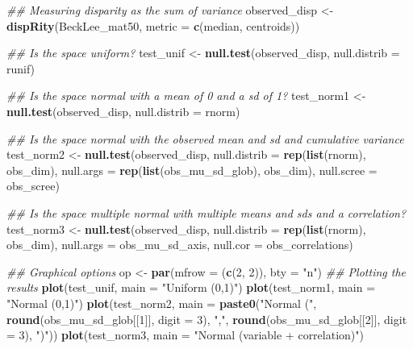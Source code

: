 \documentclass[
]{book}
\newenvironment{Shaded}{\begin{snugshade}}{\end{snugshade}}
\newcommand{\CommentTok}[1]{\textcolor[rgb]{0.56,0.35,0.01}{\textit{#1}}}
\newcommand{\DataTypeTok}[1]{\textcolor[rgb]{0.13,0.29,0.53}{#1}}
\newcommand{\DecValTok}[1]{\textcolor[rgb]{0.00,0.00,0.81}{#1}}
\newcommand{\KeywordTok}[1]{\textcolor[rgb]{0.13,0.29,0.53}{\textbf{#1}}}
\newcommand{\NormalTok}[1]{#1}
\newcommand{\StringTok}[1]{\textcolor[rgb]{0.31,0.60,0.02}{#1}}
\begin{document}
\begin{Shaded}
\begin{Highlighting}[]
\CommentTok{\#\# Measuring disparity as the sum of variance}
\NormalTok{observed\_disp \textless{}{-}}\StringTok{ }\KeywordTok{dispRity}\NormalTok{(BeckLee\_mat50, }\DataTypeTok{metric =} \KeywordTok{c}\NormalTok{(median, centroids))}

\CommentTok{\#\# Is the space uniform?}
\NormalTok{test\_unif \textless{}{-}}\StringTok{ }\KeywordTok{null.test}\NormalTok{(observed\_disp, }\DataTypeTok{null.distrib =}\NormalTok{ runif)}

\CommentTok{\#\# Is the space normal with a mean of 0 and a sd of 1?}
\NormalTok{test\_norm1 \textless{}{-}}\StringTok{ }\KeywordTok{null.test}\NormalTok{(observed\_disp, }\DataTypeTok{null.distrib =}\NormalTok{ rnorm)}

\CommentTok{\#\# Is the space normal with the observed mean and sd and cumulative variance}
\NormalTok{test\_norm2 \textless{}{-}}\StringTok{ }\KeywordTok{null.test}\NormalTok{(observed\_disp, }\DataTypeTok{null.distrib =} \KeywordTok{rep}\NormalTok{(}\KeywordTok{list}\NormalTok{(rnorm), obs\_dim),}
                        \DataTypeTok{null.args =} \KeywordTok{rep}\NormalTok{(}\KeywordTok{list}\NormalTok{(obs\_mu\_sd\_glob), obs\_dim),}
                        \DataTypeTok{null.scree =}\NormalTok{ obs\_scree)}

\CommentTok{\#\# Is the space multiple normal with multiple means and sds and a correlation?}
\NormalTok{test\_norm3 \textless{}{-}}\StringTok{ }\KeywordTok{null.test}\NormalTok{(observed\_disp, }\DataTypeTok{null.distrib =} \KeywordTok{rep}\NormalTok{(}\KeywordTok{list}\NormalTok{(rnorm), obs\_dim),}
                        \DataTypeTok{null.args =}\NormalTok{ obs\_mu\_sd\_axis, }\DataTypeTok{null.cor =}\NormalTok{ obs\_correlations)}

\CommentTok{\#\# Graphical options}
\NormalTok{op \textless{}{-}}\StringTok{ }\KeywordTok{par}\NormalTok{(}\DataTypeTok{mfrow =}\NormalTok{ (}\KeywordTok{c}\NormalTok{(}\DecValTok{2}\NormalTok{, }\DecValTok{2}\NormalTok{)), }\DataTypeTok{bty =} \StringTok{"n"}\NormalTok{)}
\CommentTok{\#\# Plotting the results}
\KeywordTok{plot}\NormalTok{(test\_unif, }\DataTypeTok{main =} \StringTok{"Uniform (0,1)"}\NormalTok{)}
\KeywordTok{plot}\NormalTok{(test\_norm1, }\DataTypeTok{main =} \StringTok{"Normal (0,1)"}\NormalTok{)}
\KeywordTok{plot}\NormalTok{(test\_norm2, }\DataTypeTok{main =} \KeywordTok{paste0}\NormalTok{(}\StringTok{"Normal ("}\NormalTok{, }\KeywordTok{round}\NormalTok{(obs\_mu\_sd\_glob[[}\DecValTok{1}\NormalTok{]], }\DataTypeTok{digit =} \DecValTok{3}\NormalTok{),}
                              \StringTok{","}\NormalTok{, }\KeywordTok{round}\NormalTok{(obs\_mu\_sd\_glob[[}\DecValTok{2}\NormalTok{]], }\DataTypeTok{digit =} \DecValTok{3}\NormalTok{), }\StringTok{")"}\NormalTok{))}
\KeywordTok{plot}\NormalTok{(test\_norm3, }\DataTypeTok{main =} \StringTok{"Normal (variable + correlation)"}\NormalTok{)}
\end{Highlighting}
\end{Shaded}
\end{document}
